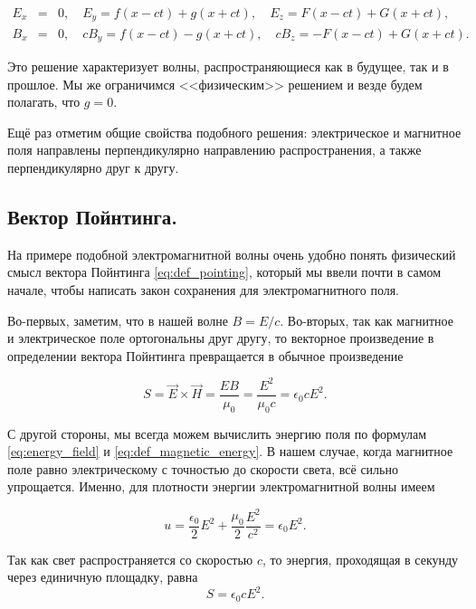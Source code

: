 \documentclass[12pt,a4paper]{article}
\numberwithin{equation}{section}
\numberwithin{equation}{section}
\newcommand{\nn}{\nonumber}
\newcommand{\eps}{\epsilon}
\begin{document}
\begin{eqnarray}
  \label{eq:waves_general_solution_2}
  \nn
E_x&=&0, \quad E_y = f(x-ct) + g(x+ct), \quad E_z = F(x-ct) + G(x+ct), \\
B_x&=&0, \quad cB_y = f(x-ct) - g(x+ct), \quad cB_z = -F(x-ct) + G(x+ct).
\end{eqnarray}

Это решение характеризует волны, распространяющиеся как в будущее, так
и в прошлое. Мы же ограничимся <<физическим>> решением и везде будем
полагать, что $g=0$.

Ещё раз отметим общие свойства подобного решения: электрическое и
магнитное поля направлены перпендикулярно направлению распространения,
а также перпендикулярно друг к другу. 

\subsection{Вектор Пойнтинга. }
\label{sec:poynting}

На примере подобной электромагнитной волны очень удобно понять
физический смысл вектора Пойнтинга \eqref{eq:def_pointing}, который мы
ввели почти в самом начале, чтобы написать закон сохранения для
электромагнитного поля.

Во-первых, заметим, что в нашей волне $B = E/c$. Во-вторых, так как
магнитное и электрическое поле ортогональны друг другу, то векторное
произведение в определении вектора Пойнтинга превращается в обычное
произведение

\begin{equation}
  \label{eq:poynting_wave_1}
  S = \vec{E} \times \vec{H} = \frac{E B}{\mu_0} = \frac{E^2}{\mu_0 c}
  = \eps_0 c E^2.
\end{equation}

С другой стороны, мы всегда можем вычислить энергию поля по формулам
\eqref{eq:energy_field} и \eqref{eq:def_magnetic_energy}. В нашем
случае, когда магнитное поле равно электрическому с точностью до
скорости света, всё сильно упрощается. Именно, для плотности энергии
электромагнитной волны имеем

\begin{equation}
  \label{eq:poynting_wave_2}
  u = \frac{\eps_0}{2}E^2 + \frac{\mu_0}{2} \frac{E^2}{c^2} = \eps_0 E^2.
\end{equation}

Так как свет распространяется со скоростью $c$, то энергия, проходящая
в секунду через единичную площадку, равна
\begin{equation}
  \label{eq:poynting_wave_3}
  S = \eps_0 c E^2.
\end{equation}
\end{document}
